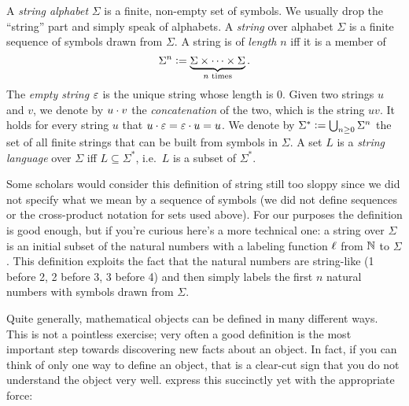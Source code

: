 \begin{definition}
    A \emph{string alphabet} $\Sigma$ is a finite, non-empty set of symbols.
    We usually drop the ``string'' part and simply speak of alphabets.
    A \emph{string} over alphabet $\Sigma$ is a finite sequence of symbols drawn from $\Sigma$.
    A string is of \emph{length} $n$ iff it is a member of
    \[
        \Sigma^n \mathrel{\mathop:}= \underbrace{\Sigma \times \cdots \times \Sigma}_{n \text{ times}}.
    \]
    The \emph{empty string} $\varepsilon$ is the unique string whose length is $0$.
    Given two strings $u$ and $v$, we denote by $u \cdot v$ the \emph{concatenation} of the two, which is the string $uv$.
    It holds for every string $u$ that $u \cdot \varepsilon = \varepsilon \cdot u = u$.
    We denote by $\Sigma^* \mathrel{\mathop:}= \bigcup_{n \geq 0} \Sigma^n$ the set of all finite strings that can be built from symbols in $\Sigma$.
    A set $L$ is a \emph{string language} over $\Sigma$ iff $L \subseteq \Sigma^*$, i.e.\ $L$ is a subset of $\Sigma^*$.
\end{definition}
%
Some scholars would consider this definition of string still too sloppy since we did not specify what we mean by a sequence of symbols (we did not define sequences or the cross-product notation for sets used above).
For our purposes the definition is good enough, but if you're curious here's a more technical one: a string over $\Sigma$ is an initial subset of the natural numbers with a labeling function $\ell$ from $\mathbb{N}$ to $\Sigma$.
This definition exploits the fact that the natural numbers are string-like (1 before 2, 2 before 3, 3 before 4) and then simply labels the first $n$ natural numbers with symbols drawn from $\Sigma$.

Quite generally, mathematical objects can be defined in many different ways.
This is not a pointless exercise; very often a good definition is the most important step towards discovering new facts about an object.
In fact, if you can think of only one way to define an object, that is a clear-cut sign that you do not understand the object very well.
\citet[10]{KeenanMoss12} express this succinctly yet with the appropriate force:
%
\begin{center}
\end{center}

